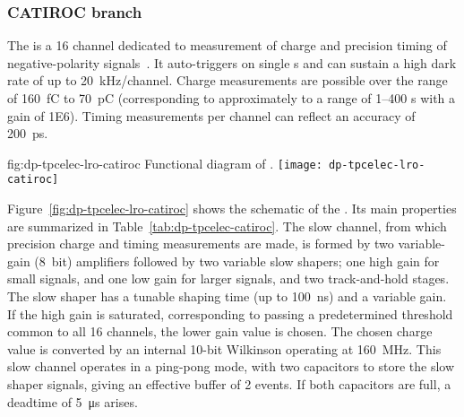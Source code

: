 \subsubsection{CATIROC branch} 

The  is a \num{16} channel  dedicated to measurement of charge and precision timing of negative-polarity  signals~\cite{Blin:2017}. It auto-triggers on single \phel{}s and can sustain a high dark rate of up to \SI{20}{kHz/channel}. Charge measurements are possible over the range of \SI{160}{fC} to \SI{70}{pC} (corresponding to approximately to a range of \numrange{1}{400} \phel{}s with a  gain of \num{1E6}). Timing measurements per channel can reflect an accuracy of \SI{200}{ps}.

\begin{dunefigure}{fig:dp-tpcelec-lro-catiroc}
{Functional diagram of  .}
\texttt{[image: dp-tpcelec-lro-catiroc]}
\end{dunefigure}

Figure~\ref{fig:dp-tpcelec-lro-catiroc} shows the schematic of the  . Its main properties are summarized in Table~\ref{tab:dp-tpcelec-catiroc}. The slow channel, from which precision charge and timing measurements are made, is formed by two variable-gain (\SI{8}{bit}) amplifiers followed by two variable slow shapers; one high gain for small signals, and one low gain for larger signals, and two track-and-hold stages. The slow shaper has a tunable shaping time (up to \SI{100}{ns}) and a variable gain.  If the high gain is saturated, corresponding to passing a predetermined threshold common to all \num{16} channels, the lower gain value is chosen. The chosen charge value is converted by an internal 10-bit Wilkinson  operating at \SI{160}{MHz}.  This slow channel operates in a ping-pong mode, with two capacitors to store the slow shaper signals, giving an effective buffer of 2 events. If both capacitors are full, a deadtime of \SI{5}{\micro\second} arises.

